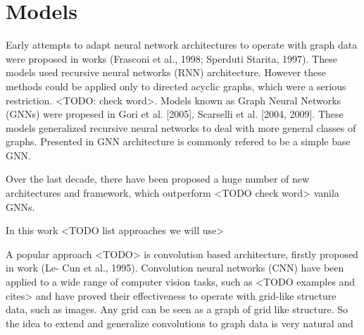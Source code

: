 \section{Models}
\label{sec:models}





Early attempts to adapt neural network architectures to operate with graph data 
were proposed in works (Frasconi et al., 1998; Sperduti  Starita, 1997). These models 
used recursive neural networks (RNN) architecture. However these methods could be applied
only to directed acyclic graphs, which were a serious restriction. <TODO: check word>.
Models known as Graph Neural Networks (GNNs) were propesed in  Gori et al. [2005], Scarselli et al. [2004, 2009].
These models generalized recursive neural networks to deal with more general classes of graphs.
Presented in \cite{GNN} GNN architecture is commonly refered to be a simple base GNN.



Over the last decade, there have been proposed a huge number of new architectures and framework, which 
outperform <TODO check word> vanila GNNs. 



In this work <TODO list approaches we will use>



A popular approach <TODO> is convolution based architecture, firstly proposed in work (Le-
Cun et al., 1995).
Convolution neural networks (CNN) have been applied to a wide range of computer
vision tasks, such as <TODO examples and cites> and have proved their effectiveness
to operate with grid-like structure data, such as images.
Any grid can be seen as a graph of grid like structure. So the idea to extend and generalize
convolutions to graph data is very natural and %


